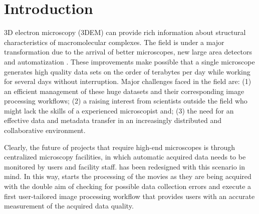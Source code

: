 
\section{Introduction}

3D electron microscopy (3DEM)  can provide rich information about structural characteristics of macromolecular complexes. The field is under a major transformation due to the arrival of better microscopes, new large area detectors and automatization \citep{kuhlbrandt2014a, Kuhlbrandt2014b}. These improvements make possible that a single microscope generates high quality data sets on the order of terabytes per day \citep{Saibil2015} while working for several days without interruption. Major challenges faced in the field are: (1) an efficient management of these huge datasets and their corresponding image processing workflows; (2) a raising interest from scientists outside the field who might lack the skills of a experienced microscopist and; (3) the need for an effective data and metadata transfer in an increasingly distributed and collaborative environment. %



Clearly, the future of projects that require high-end microscopes is through centralized microscopy facilities, in which automatic acquired data needs to be monitored by users and facility staff.  \scipion has been redesigned with this scenario in mind. %
In this way, \scipion starts the processing of the movies as they are being acquired with the double aim of checking for possible data collection errors and execute a first user-tailored image processing workflow that provides users with an accurate measurement of the acquired data quality.

